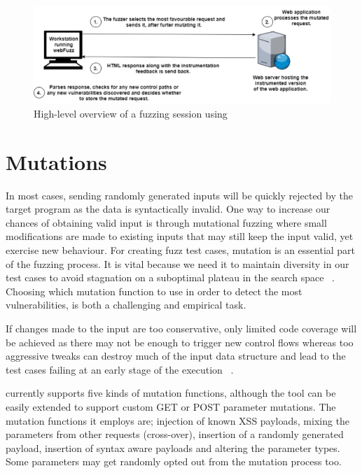 \begin{figure}[ht]
 \centering
 \captionsetup{justification=centering}
 \includegraphics[width=\linewidth]{figures/architecture.pdf}
 \caption{High-level overview of a fuzzing session using \pname{}}
 \label{fig:architecture}
\end{figure}

\section{Mutations}
In most cases, sending randomly generated inputs will be quickly rejected by the target program as the data is syntactically invalid. One way to increase our chances of obtaining valid input is through mutational fuzzing where small modifications are made to existing inputs that may still keep the input valid, yet exercise new behaviour. For creating fuzz test cases, mutation is an essential part of the fuzzing process. It is vital because we need it to maintain diversity in our test cases to avoid stagnation on a suboptimal plateau in the search space ~\cite{seal2016Genetic}. Choosing which mutation function to use in order to detect the most vulnerabilities, is both a challenging and empirical task. 

If changes made to the input are too conservative, only limited code coverage will be achieved as there may not be enough to trigger new control flows whereas too aggressive tweaks can destroy much of the input data structure and lead to the test cases failing at an early stage of the execution ~\cite{zalewski2014Mutations}.

\pname{} currently supports five kinds of mutation functions, although the tool can be easily
extended to support custom GET or POST parameter mutations. The mutation functions it employs are; injection of known XSS payloads, mixing the parameters from other requests (cross-over), insertion of a randomly generated payload, insertion of syntax aware payloads and altering the
parameter types. Some parameters may get randomly opted out from the mutation process too. 

